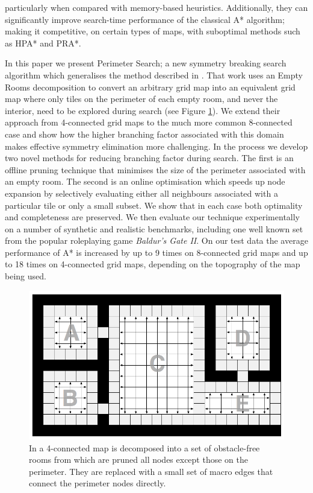 particularly when compared with memory-based heuristics.
Additionally, they can significantly improve search-time performance of the classical A* algorithm; making it competitive,
on certain types of maps, with suboptimal methods such as HPA* and PRA*.
\par
In this paper we present Perimeter Search; a new symmetry breaking search algorithm which generalises the method described in \cite{harabor10}.
That work uses an Empty Rooms decomposition to convert an arbitrary grid map into an
equivalent grid map where only tiles on the perimeter of each empty room, and never the interior, need to be explored
during search (see Figure \ref{fig-overview}).
We extend their approach from 4-connected grid maps to the much more common 8-connected case and show how the higher branching factor associated 
with this domain makes effective symmetry elimination more challenging.
In the process we develop two novel methods for reducing branching factor during search.
The first is an offline pruning technique that minimises the size of the perimeter associated with an empty room.
The second is an online optimisation which speeds up node expansion by selectively evaluating either all neighbours
associated with a particular tile or only a small subset.
We show that in each case both optimality and completeness are preserved.
We then evaluate our technique experimentally on a number of synthetic and realistic benchmarks, including one well known set 
from the popular roleplaying game \emph{Baldur's Gate II}.
On our test data the average performance of A* is increased by up to 9 times on 8-connected grid maps and up to
18 times on 4-connected grid maps, depending on the topography of the map being used.

\begin{figure}[tb]
       \begin{center}
                       \includegraphics[scale=0.30, trim = 10mm 10mm 10mm 0mm]{diagrams/overview.png}
       \end{center}
	\vspace{-3pt}
       \caption{In \cite{harabor10} a 4-connected map is decomposed into a set of obstacle-free rooms from which are pruned all nodes except those on the perimeter.
				They are replaced with a small set of macro edges that connect the perimeter nodes directly.}
       \label{fig-overview}
\end{figure}
